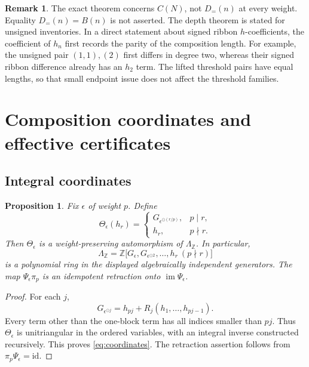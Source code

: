 \documentclass[11pt,a4paper]{amsart}
\numberwithin{equation}{section}
\theoremstyle{plain}
\newtheorem{proposition}[theorem]{Proposition}
\theoremstyle{definition}
\newtheorem{remark}[theorem]{Remark}
\newcommand{\Z}{\mathbb Z}
\begin{document}
\begin{remark}\label{rem:exact-scope}
The exact theorem concerns \(C(N)\), not \(D_{=}(n)\) at every weight.
Equality \(D_{=}(n)=B(n)\) is not asserted.  The depth theorem is stated for
unsigned inventories.  In a direct statement about signed ribbon
\(h\)-coefficients, the coefficient of \(h_n\) first records the parity of the
composition length.  For example, the unsigned pair \((1,1),(2)\) first
differs in degree two, whereas their signed ribbon difference already has
an \(h_2\) term.  The lifted threshold pairs have equal lengths, so that
small endpoint issue does not affect the threshold families.
\end{remark}

\section{Composition coordinates and effective certificates}\label{sec:recovery}

\subsection{Integral coordinates}
\begin{proposition}\label{prop:coordinates}
Fix \(\epsilon\) of weight \(p\).  Define
\[
\Theta_\epsilon(h_r)=
\begin{cases}
G_{\epsilon^{\odot(r/p)}},&p\mid r,\\
h_r,&p\nmid r.
\end{cases}
\]
Then \(\Theta_\epsilon\) is a weight-preserving automorphism of
\(\Lambda_\Z\).  In particular,
\begin{equation}\label{eq:coordinates}
\Lambda_\Z=
\Z\bigl[G_{\epsilon},G_{\epsilon^{\odot2}},\ldots,
 h_r\ (p\nmid r)\bigr]
\end{equation}
is a polynomial ring in the displayed algebraically independent generators.
The map \(\Psi_\epsilon\pi_p\) is an idempotent retraction onto
\(\operatorname{im}\Psi_\epsilon\).
\end{proposition}
\begin{proof}
For each \(j\),
\[
G_{\epsilon^{\odot j}}=h_{pj}+R_j(h_1,\ldots,h_{pj-1}).
\]
Every term other than the one-block term has all indices smaller than \(pj\).
Thus \(\Theta_\epsilon\) is unitriangular in the ordered variables, with
an integral inverse constructed recursively.  This proves
\eqref{eq:coordinates}.  The retraction assertion follows from
\(\pi_p\Psi_\epsilon=\mathrm{id}\).
\end{proof}
\end{document}
